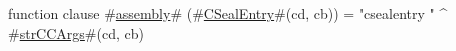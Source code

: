 function clause #\hyperref[sailMIPSzassembly]{assembly}# (#\hyperref[sailMIPSzCSealEntry]{CSealEntry}#(cd, cb)) = "csealentry " ^ #\hyperref[sailMIPSzstrCCArgs]{strCCArgs}#(cd, cb)
